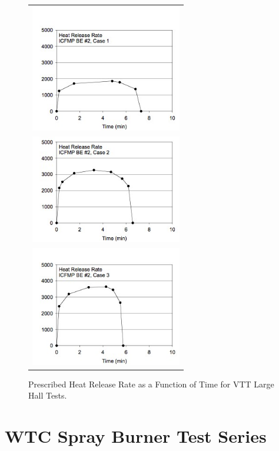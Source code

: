 \begin{figure}[p]
\begin{center}
\begin{tabular}{c}
\includegraphics[width=2.6in]{FIGURES/VTT/VTT_Case1_HRR} \\
\includegraphics[width=2.6in]{FIGURES/VTT/VTT_Case2_HRR} \\
\includegraphics[width=2.6in]{FIGURES/VTT//VTT_Case3_HRR}
\end{tabular}
\end{center}
\caption{Prescribed Heat Release Rate as a Function of Time for VTT Large Hall Tests.} \label{fig:VTT_HRR}
\end{figure}

\clearpage
\clearpage

\section{WTC Spray Burner Test Series}

